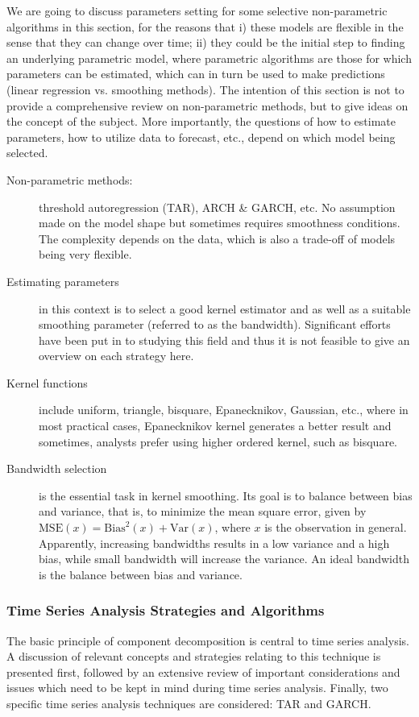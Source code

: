 We are going to discuss parameters setting for some selective non-parametric algorithms in this section, for the reasons that i) these models are flexible in the sense that they can change over time; ii) they could be the initial step to finding an underlying parametric model, where parametric algorithms are those for which parameters can be estimated, which can in turn be used to make predictions (linear regression vs. smoothing methods). The intention of this section is not to provide a comprehensive review on non-parametric methods, but to give ideas on the concept of the subject. More importantly, the questions of how to estimate parameters, how to utilize data to forecast, etc., depend on which model being selected.
\begin{description}
\item[Non-parametric methods:] threshold autoregression (TAR), ARCH \& GARCH, etc.
No assumption made on the model shape but sometimes requires smoothness conditions. The complexity depends on the data, which is also a trade-off of models being very flexible. 
\item[Estimating parameters] in this context is to select a good kernel estimator and as well as a suitable smoothing parameter (referred to as the bandwidth). Significant efforts have been put in to studying this field and thus it is not feasible to give an overview on each strategy here. 
\item[Kernel functions] include uniform, triangle, bisquare, Epanecknikov, Gaussian, etc., where in most practical cases, Epanecknikov kernel generates a better result and sometimes, analysts prefer using higher ordered kernel, such as bisquare.
\item[Bandwidth selection] is the essential task in kernel smoothing. Its goal is to balance between bias and variance, that is, to minimize the mean square error, given by $ \mathrm{MSE}(x) = \mathrm{Bias}^2 (x) + \mathrm{Var}(x) $, where $x$ is the observation in general.
Apparently, increasing bandwidths results in a low variance and a high bias, while small bandwidth will increase the variance. An ideal bandwidth is the balance between bias and variance. 
\end{description}


\subsubsection{Time Series Analysis Strategies and Algorithms}

The basic principle of component decomposition is central to time series analysis. A discussion of relevant concepts and strategies relating to this technique is presented first, followed by an extensive review of important considerations and issues which need to be kept in mind during time series analysis. Finally, two specific time series analysis techniques are considered: TAR and GARCH.

